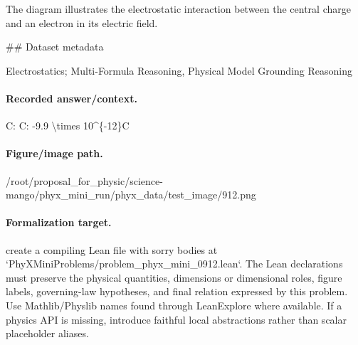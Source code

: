 The diagram illustrates the electrostatic interaction between the central charge and an electron in its electric field.

\#\# Dataset metadata

Electrostatics; Multi-Formula Reasoning, Physical Model Grounding Reasoning

\paragraph{Recorded answer/context.}
C: C: -9.9 \textbackslash{}times 10\textasciicircum{}\{-12\}C

\paragraph{Figure/image path.}
/root/proposal\_for\_physic/science-mango/phyx\_mini\_run/phyx\_data/test\_image/912.png

\paragraph{Formalization target.}
create a compiling Lean file with sorry bodies at `PhyXMiniProblems/problem\_phyx\_mini\_0912.lean`. The Lean declarations must preserve the physical quantities, dimensions or dimensional roles, figure labels, governing-law hypotheses, and final relation expressed by this problem.
Use Mathlib/Physlib names found through LeanExplore where available. If a physics API is missing, introduce faithful local abstractions rather than scalar placeholder aliases.

